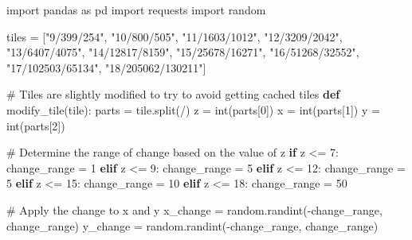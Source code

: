 \documentclass[
  oneside,
  open=any]{scrbook}
\newenvironment{Shaded}{\begin{snugshade}}{\end{snugshade}}
\newcommand{\BuiltInTok}[1]{\textcolor[rgb]{0.00,0.23,0.31}{#1}}
\newcommand{\CommentTok}[1]{\textcolor[rgb]{0.37,0.37,0.37}{#1}}
\newcommand{\ControlFlowTok}[1]{\textcolor[rgb]{0.00,0.23,0.31}{\textbf{#1}}}
\newcommand{\DecValTok}[1]{\textcolor[rgb]{0.68,0.00,0.00}{#1}}
\newcommand{\ImportTok}[1]{\textcolor[rgb]{0.00,0.46,0.62}{#1}}
\newcommand{\KeywordTok}[1]{\textcolor[rgb]{0.00,0.23,0.31}{\textbf{#1}}}
\newcommand{\NormalTok}[1]{\textcolor[rgb]{0.00,0.23,0.31}{#1}}
\newcommand{\OperatorTok}[1]{\textcolor[rgb]{0.37,0.37,0.37}{#1}}
\newcommand{\StringTok}[1]{\textcolor[rgb]{0.13,0.47,0.30}{#1}}
\begin{document}
\begin{Shaded}
\begin{Highlighting}[]
\ImportTok{import}\NormalTok{ pandas }\ImportTok{as}\NormalTok{ pd}
\ImportTok{import}\NormalTok{ requests}
\ImportTok{import}\NormalTok{ random}

\NormalTok{tiles }\OperatorTok{=}\NormalTok{ [}\StringTok{"9/399/254"}\NormalTok{, }\StringTok{"10/800/505"}\NormalTok{, }\StringTok{"11/1603/1012"}\NormalTok{,  }\StringTok{"12/3209/2042"}\NormalTok{, }
\StringTok{"13/6407/4075"}\NormalTok{, }\StringTok{"14/12817/8159"}\NormalTok{, }\StringTok{"15/25678/16271"}\NormalTok{, }\StringTok{"16/51268/32552"}\NormalTok{, }
\StringTok{"17/102503/65134"}\NormalTok{, }\StringTok{"18/205062/130211"}\NormalTok{]}

\CommentTok{\# Tiles are slightly modified to try to avoid getting cached tiles}
\KeywordTok{def}\NormalTok{ modify\_tile(tile):}
\NormalTok{    parts }\OperatorTok{=}\NormalTok{ tile.split(}\StringTok{\textquotesingle{}/\textquotesingle{}}\NormalTok{)}
\NormalTok{    z }\OperatorTok{=} \BuiltInTok{int}\NormalTok{(parts[}\DecValTok{0}\NormalTok{])}
\NormalTok{    x }\OperatorTok{=} \BuiltInTok{int}\NormalTok{(parts[}\DecValTok{1}\NormalTok{])}
\NormalTok{    y }\OperatorTok{=} \BuiltInTok{int}\NormalTok{(parts[}\DecValTok{2}\NormalTok{])}

    \CommentTok{\# Determine the range of change based on the value of z}
    \ControlFlowTok{if}\NormalTok{ z }\OperatorTok{\textless{}=} \DecValTok{7}\NormalTok{:}
\NormalTok{        change\_range }\OperatorTok{=} \DecValTok{1}
    \ControlFlowTok{elif}\NormalTok{ z }\OperatorTok{\textless{}=} \DecValTok{9}\NormalTok{:}
\NormalTok{        change\_range }\OperatorTok{=} \DecValTok{5}
    \ControlFlowTok{elif}\NormalTok{ z }\OperatorTok{\textless{}=} \DecValTok{12}\NormalTok{:}
\NormalTok{        change\_range }\OperatorTok{=} \DecValTok{5}
    \ControlFlowTok{elif}\NormalTok{ z }\OperatorTok{\textless{}=} \DecValTok{15}\NormalTok{:}
\NormalTok{        change\_range }\OperatorTok{=} \DecValTok{10}
    \ControlFlowTok{elif}\NormalTok{ z }\OperatorTok{\textless{}=} \DecValTok{18}\NormalTok{:}
\NormalTok{        change\_range }\OperatorTok{=} \DecValTok{50}

    \CommentTok{\# Apply the change to x and y}
\NormalTok{    x\_change }\OperatorTok{=}\NormalTok{ random.randint(}\OperatorTok{{-}}\NormalTok{change\_range, change\_range)}
\NormalTok{    y\_change }\OperatorTok{=}\NormalTok{ random.randint(}\OperatorTok{{-}}\NormalTok{change\_range, change\_range)}


\end{Highlighting}
\end{Shaded}
\end{document}
